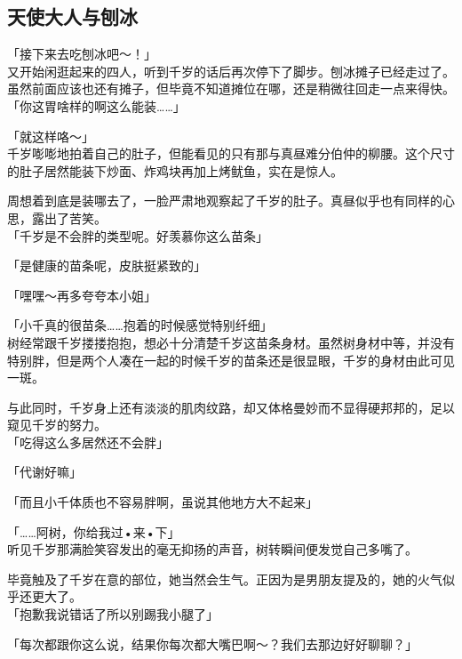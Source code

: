 \subsection{天使大人与刨冰}

「接下来去吃刨冰吧～！」\\

又开始闲逛起来的四人，听到千岁的话后再次停下了脚步。刨冰摊子已经走过了。虽然前面应该也还有摊子，但毕竟不知道摊位在哪，还是稍微往回走一点来得快。\\

「你这胃啥样的啊这么能装……」

「就这样咯～」\\

千岁嘭嘭地拍着自己的肚子，但能看见的只有那与真昼难分伯仲的柳腰。这个尺寸的肚子居然能装下炒面、炸鸡块再加上烤鱿鱼，实在是惊人。

周想着到底是装哪去了，一脸严肃地观察起了千岁的肚子。真昼似乎也有同样的心思，露出了苦笑。\\

「千岁是不会胖的类型呢。好羡慕你这么苗条」

「是健康的苗条呢，皮肤挺紧致的」

「嘿嘿～再多夸夸本小姐」

「小千真的很苗条……抱着的时候感觉特别纤细」\\

树经常跟千岁搂搂抱抱，想必十分清楚千岁这苗条身材。虽然树身材中等，并没有特别胖，但是两个人凑在一起的时候千岁的苗条还是很显眼，千岁的身材由此可见一斑。

与此同时，千岁身上还有淡淡的肌肉纹路，却又体格曼妙而不显得硬邦邦的，足以窥见千岁的努力。\\

「吃得这么多居然还不会胖」

「代谢好嘛」

「而且小千体质也不容易胖啊，虽说其他地方大不起来」

「……阿树，你给我过•来•下」\\

听见千岁那满脸笑容发出的毫无抑扬的声音，树转瞬间便发觉自己多嘴了。

毕竟触及了千岁在意的部位，她当然会生气。正因为是男朋友提及的，她的火气似乎还更大了。\\

「抱歉我说错话了所以别踢我小腿了」

「每次都跟你这么说，结果你每次都大嘴巴啊～？我们去那边好好聊聊？」\\

